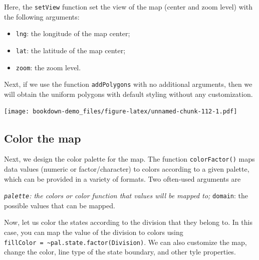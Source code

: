 \documentclass[]{book}
\newenvironment{Shaded}{\begin{snugshade}}{\end{snugshade}}
\newcommand{\KeywordTok}[1]{\textcolor[rgb]{0.13,0.29,0.53}{\textbf{#1}}}
\newcommand{\DataTypeTok}[1]{\textcolor[rgb]{0.13,0.29,0.53}{#1}}
\newcommand{\StringTok}[1]{\textcolor[rgb]{0.31,0.60,0.02}{#1}}
\newcommand{\OperatorTok}[1]{\textcolor[rgb]{0.81,0.36,0.00}{\textbf{#1}}}
\newcommand{\NormalTok}[1]{#1}
\providecommand{\tightlist}{%
  \setlength{\itemsep}{0pt}\setlength{\parskip}{0pt}}
\begin{document}
Here, the \texttt{setView} function set the view of the map (center and
zoom level) with the following arguments:

\begin{itemize}
\tightlist
\item
  \texttt{lng}: the longitude of the map center;
\item
  \texttt{lat}: the latitude of the map center;
\item
  \texttt{zoom}: the zoom level.
\end{itemize}

Next, if we use the function \texttt{addPolygons} with no additional
arguments, then we will obtain the uniform polygons with default styling
without any customization.

\begin{Shaded}
\end{Shaded}

\texttt{[image: bookdown-demo\_files/figure-latex/unnamed-chunk-112-1.pdf]}

\subsection{Color the map}\label{color-the-map}

Next, we design the color palette for the map. The function
\texttt{colorFactor()} maps data values (numeric or factor/character) to
colors according to a given palette, which can be provided in a variety
of formats. Two often-used arguments are

\emph{\texttt{palette}: the colors or color function that values will be
mapped to; }\texttt{domain}: the possible values that can be mapped.

\begin{Shaded}
\end{Shaded}

Now, let us color the states according to the division that they belong
to. In this case, you can map the value of the division to colors using
\texttt{fillColor\ =\ \textasciitilde{}pal.state.factor(Division)}. We
can also customize the map, change the color, line type of the state
boundary, and other tyle properties.
\end{document}
